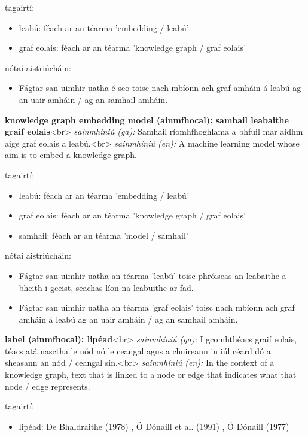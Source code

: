 \documentclass{article}
\begin{document}
tagairtí:
\begin{itemize}
	\item leabú: féach ar an téarma 'embedding / leabú'
	\item graf eolais: féach ar an téarma 'knowledge graph / graf eolais'
\end{itemize}

nótaí aistriúcháin:
\begin{itemize}
	\item Fágtar san uimhir uatha é seo toisc nach mbíonn ach graf amháin á leabú ag an uair amháin / ag an samhail amháin.
\end{itemize}


\textbf{knowledge graph embedding model (ainmfhocal): samhail leabaithe graif eolais}<br>
\textit{sainmhíniú (ga):} Samhail ríomhfhoghlama a bhfuil mar aidhm aige graf eolais a leabú.<br>
\textit{sainmhíniú (en):} A machine learning model whose aim is to embed a knowledge graph.

tagairtí:
\begin{itemize}
	\item leabú: féach ar an téarma 'embedding / leabú'
	\item graf eolais: féach ar an téarma 'knowledge graph / graf eolais'
	\item samhail: féach ar an téarma 'model / samhail'
\end{itemize}

nótaí aistriúcháin:
\begin{itemize}
	\item Fágtar san uimhir uatha an téarma 'leabú' toisc phróiseas an leabaithe a bheith i gceist, seachas líon na leabuithe ar fad.
	\item Fágtar san uimhir uatha an téarma 'graf eolais' toisc nach mbíonn ach graf amháin á leabú ag an uair amháin / ag an samhail amháin.
\end{itemize}


\textbf{label (ainmfhocal): lipéad}<br>
\textit{sainmhíniú (ga):} I gcomhthéacs graif eolais, téacs atá nasctha le nód nó le ceangal agus a chuireann in iúl céard dó a sheasann an nód / ceangal sin.<br>
\textit{sainmhíniú (en):} In the context of a knowledge graph, text that is linked to a node or edge that indicates what that node / edge represents.

tagairtí:
\begin{itemize}
	\item lipéad: De Bhaldraithe (1978) \cite{de-bhaldraithe}, Ó Dónaill et al. (1991) \cite{focloir-beag}, Ó Dónaill (1977) \cite{odonaill}
\end{itemize}
\end{document}
